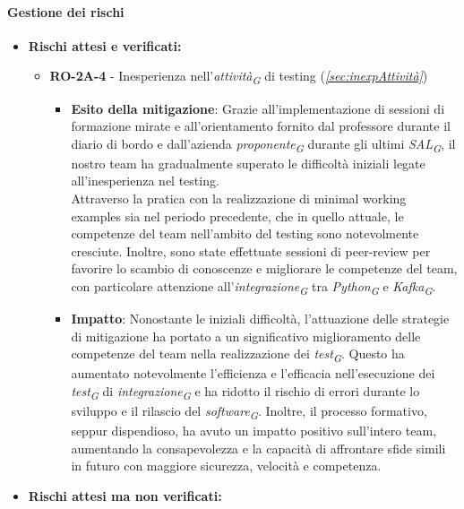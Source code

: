 \paragraph{Gestione dei rischi}

\begin{itemize}
    \item \textbf{Rischi attesi e verificati:}
    \begin{itemize}
        \item \textbf{RO-2A-4} - Inesperienza nell'\textit{attività}\textsubscript{\textit{G}} di testing (\textit{\ref{sec:inexpAttività}})
        \begin{itemize}
            \item \textbf{Esito della mitigazione}: Grazie all'implementazione di sessioni di formazione mirate e all'orientamento fornito dal professore durante il diario di bordo e dall'azienda \textit{proponente}\textsubscript{\textit{G}} durante gli ultimi \textit{SAL}\textsubscript{\textit{G}}, il nostro team ha gradualmente superato le difficoltà iniziali legate all'inesperienza nel testing. \\
            Attraverso la pratica con la realizzazione di minimal working examples sia nel periodo precedente, che in quello attuale, le competenze del team nell'ambito del testing sono notevolmente cresciute. Inoltre, sono state effettuate sessioni di peer-review per favorire lo scambio di conoscenze e migliorare le competenze del team, con particolare attenzione all'\textit{integrazione}\textsubscript{\textit{G}} tra \textit{Python}\textsubscript{\textit{G}} e \textit{Kafka}\textsubscript{\textit{G}}.
            \item \textbf{Impatto}: Nonostante le iniziali difficoltà, l'attuazione delle strategie di mitigazione ha portato a un significativo miglioramento delle competenze del team nella realizzazione dei \textit{test}\textsubscript{\textit{G}}. Questo ha aumentato notevolmente l'efficienza e l'efficacia nell'esecuzione dei \textit{test}\textsubscript{\textit{G}} di \textit{integrazione}\textsubscript{\textit{G}} e ha ridotto il rischio di errori durante lo sviluppo e il rilascio del \textit{software}\textsubscript{\textit{G}}. Inoltre, il processo formativo, seppur dispendioso, ha avuto un impatto positivo sull'intero team, aumentando la consapevolezza e la capacità di affrontare sfide simili in futuro con maggiore sicurezza, velocità e competenza.
        \end{itemize}
    \end{itemize}
\item \textbf{Rischi attesi ma non verificati:}

\end{itemize}
